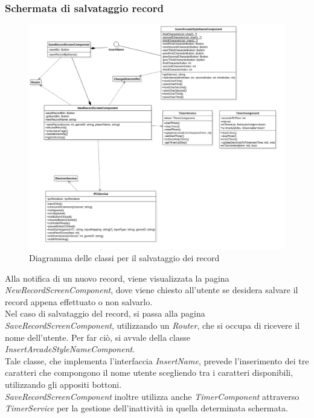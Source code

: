 \subsubsection{Schermata di salvataggio record}
\begin{figure}[h]
    \centering
    \includegraphics[width=340pt]{images/prog/NewRecord.png}
    \caption{Diagramma delle classi per il salvataggio dei record}
    \label{fig:newRecord}
\end{figure}
Alla notifica di un nuovo record, viene visualizzata la pagina \emph{NewRecordScreenComponent}, dove viene chiesto all'utente se desidera salvare il record appena effettuato o non salvarlo.\\
Nel caso di salvataggio del record, si passa alla pagina \emph{SaveRecordScreenComponent}, utilizzando un \emph{Router}, che si occupa di ricevere il nome dell'utente. Per far ciò, si avvale della classe \emph{InsertArcadeStyleNameComponent}.\\
Tale classe, che implementa l'interfaccia \emph{InsertName}, prevede l'inserimento dei tre caratteri che compongono il nome utente scegliendo tra i caratteri disponibili, utilizzando gli appositi bottoni.\\
\emph{SaveRecordScreenComponent} inoltre utilizza anche \emph{TimerComponent} attraverso \emph{TimerService} per la gestione dell'inattività in quella determinata schermata.
\newpage

